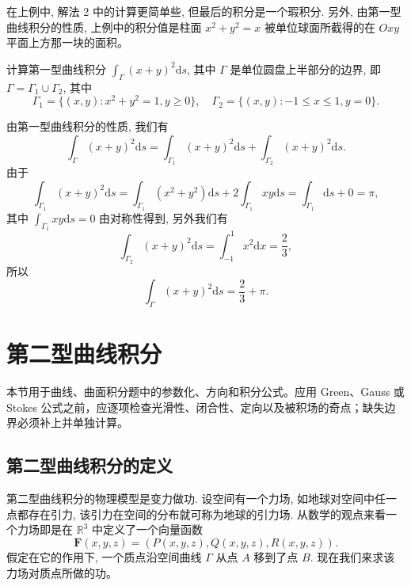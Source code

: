 \documentclass[12pt,fontset=fandol]{ctexart}
\begin{document}
\begin{remark}\quad 在上例中, 解法 2 中的计算更简单些, 但最后的积分是一个瑕积分. 另外, 由第一型曲线积分的性质, 上例中的积分值是柱面 $x^2+y^2=x$ 被单位球面所截得的在 $Oxy$ 平面上方那一块的面积。

\end{remark}
\begin{example}\label{course-example-16-1-2}\quad 计算第一型曲线积分 $\int_\Gamma (x+y)^2\mathrm ds$, 其中 $\Gamma$ 是单位圆盘上半部分的边界, 即 $\Gamma=\Gamma_1\cup\Gamma_2$, 其中
\[
  \Gamma_1=\{(x,y):x^2+y^2=1,y\geqslant0\},\quad
  \Gamma_2=\{(x,y):-1\leqslant x\leqslant1,y=0\}.
\]

\end{example}
\begin{solve}\quad 由第一型曲线积分的性质, 我们有
\[
  \int_\Gamma (x+y)^2\mathrm ds
  =\int_{\Gamma_1}(x+y)^2\mathrm ds+\int_{\Gamma_2}(x+y)^2\mathrm ds.
\]
由于
\[
  \int_{\Gamma_1}(x+y)^2\mathrm ds
  =\int_{\Gamma_1}(x^2+y^2)\mathrm ds+2\int_{\Gamma_1}xy\mathrm ds
  =\int_{\Gamma_1}\mathrm ds+0=\pi,
\]
其中 $\int_{\Gamma_1}xy\mathrm ds=0$ 由对称性得到, 另外我们有
\[
  \int_{\Gamma_2}(x+y)^2\mathrm ds
  =\int_{-1}^1 x^2\mathrm dx=\frac23,
\]
所以
\[
  \int_\Gamma (x+y)^2\mathrm ds=\frac23+\pi.
\]

\end{solve}


\section{第二型曲线积分}\label{course-16-2}
本节用于曲线、曲面积分题中的参数化、方向和积分公式。应用 Green、Gauss 或 Stokes 公式之前，应逐项检查光滑性、闭合性、定向以及被积场的奇点；缺失边界必须补上并单独计算。

\subsection{第二型曲线积分的定义}

第二型曲线积分的物理模型是变力做功. 设空间有一个力场, 如地球对空间中任一点都存在引力, 该引力在空间的分布就可称为地球的引力场. 从数学的观点来看一个力场即是在 $\mathbb R^3$ 中定义了一个向量函数
\[
  \boldsymbol F(x,y,z)=(P(x,y,z),Q(x,y,z),R(x,y,z)).
\]
假定在它的作用下, 一个质点沿空间曲线 $\Gamma$ 从点 $A$ 移到了点 $B$. 现在我们来求该力场对质点所做的功。
\end{document}
